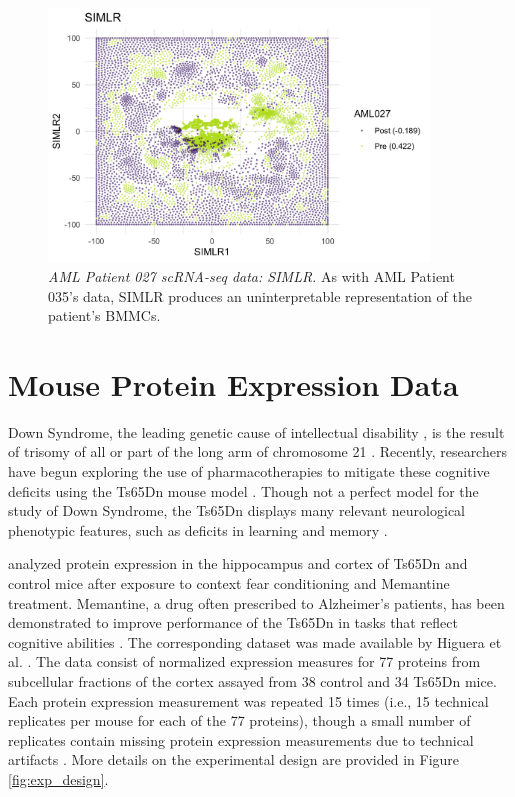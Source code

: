 \documentclass{article}
\begin{document}
\begin{figure}[!htbp]
    \centering
    \includegraphics[width=0.9\textwidth]{figures/aml027_SIMLR.png}
    \caption{
    {\em AML Patient 027 scRNA-seq data: SIMLR.} As with AML Patient 035's data, SIMLR produces an uninterpretable representation of the patient's BMMCs.}
    \label{fig:SIMLR_aml_027}
\end{figure}

\FloatBarrier

\section{Mouse Protein Expression Data}\label{sup_mice}

Down Syndrome, the leading genetic cause of intellectual disability \citep{Irving2008}, is the result of trisomy of all or part of the long arm of chromosome 21 \citep{Ahmed2015}. Recently, researchers have begun exploring the use of pharmacotherapies to mitigate these cognitive deficits using the Ts65Dn mouse model \citep{Ahmed2015,Higuera2015}. Though not a perfect model for the study of Down Syndrome, the Ts65Dn displays many relevant neurological phenotypic features, such as deficits in learning and memory \citep{Rueda2012}.

\citet{Ahmed2015} analyzed protein expression in the hippocampus and cortex of Ts65Dn and control mice after exposure to context fear conditioning and Memantine treatment. Memantine, a drug often prescribed to Alzheimer's patients, has been demonstrated to improve performance of the Ts65Dn in tasks that reflect cognitive abilities \citep{Ahmed2015}. The corresponding dataset was made available by Higuera et al. \citep{Higuera2015}. The data consist of normalized expression measures for 77 proteins from subcellular fractions of the cortex assayed from 38 control and 34 Ts65Dn mice. Each protein expression measurement was repeated 15 times (i.e., 15 technical replicates per mouse for each of the 77 proteins), though a small number of replicates contain missing protein expression measurements due to technical artifacts \citep{Higuera2015}. More details on the experimental design are provided in Figure \ref{fig:exp_design}.
\end{document}
